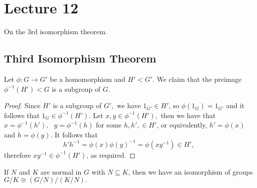 \section{Lecture 12}
On the 3rd isomorphism theorem.
\subsection{Third Isomorphism Theorem}
\begin{lemma}
  Let $\phi:G\to G'$ be a homomorphism and $H'<G'$. We claim that the preimage
  $\phi^{-1}(H')<G$ is a subgroup of $G$. 
  \label{lem:preImgSubgroup}
\end{lemma}
\begin{proof}
  Since $H'$ is a subgroup of $G',$ we have $1_{G'}\in H'$, so $\phi(1_{G})=1_{G'}$ and it follows that $1_{G}\in \phi^{-1}(H')$. Let $x,y\in\phi^{-1}(H'),$ then we have that $x=\phi^{-1}(h'),\text{ }y=\phi^{-1}(h)$ for some $h,h',\in H'$, or equivalently, $h'=\phi(x)$ and $h=\phi(y).$ It follows that $$h'h^{-1}=\phi(x)\phi(y)^{-1} = \phi(xy^{-1})\in H',$$ therefore $xy^{-1}\in\phi^{-1}(H')$,
  as required.
\end{proof}


\begin{theorem} 
If $N$ and $K$ are normal in $G$ with $N \subseteq K$, then we have an isomorphism of groups $G/K \cong (G/N)/(K/N).$
  \label{thm:tit}
\end{theorem}

